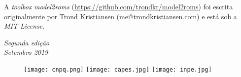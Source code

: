 \noindent A \textit{toolbox} \textit{model2roms} (\textcolor{bleu_cite}{\href{https://github.com/trondkr/model2roms}{https://github.com/trondkr/model2roms}}) foi escrita originalmente por 
          Trond Kristiansen (\textcolor{bleu_cite}{\href{me@trondkristiansen.com}{me@trondkristiansen.com}}) e está sob a \textit{MIT License}. 
\bigskip

\noindent \textit{Segunda edição} 
\\ 
\noindent \textit{Setembro 2019} 
\\

\begin{figure}[H]
    \centering
    \vspace*{\fill}
    \texttt{[image: cnpq.png]}
    \hspace{3cm}
    \texttt{[image: capes.jpg]}
    \hspace{3cm}    
    \texttt{[image: inpe.jpg]}
\end{figure}
